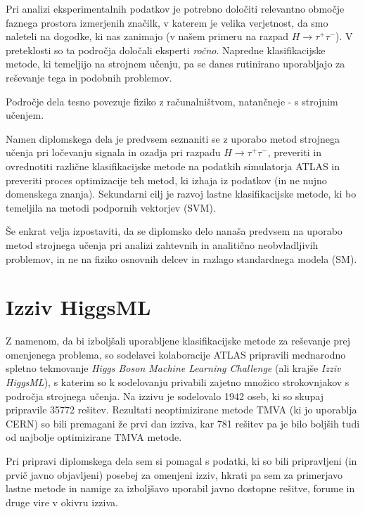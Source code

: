 \documentclass[11pt,a4paper,openany]{book}
\begin{document}
Pri analizi eksperimentalnih podatkov je potrebno določiti relevantno območje faznega prostora izmerjenih značilk, v katerem je velika verjetnost, da smo naleteli na dogodke, ki nas zanimajo (v našem primeru na razpad $H \rightarrow \tau^+\tau^-$). V preteklosti so ta področja določali eksperti \textit{ročno}\cite{Adam-Bourdarios14}. Napredne klasifikacijske metode, ki temeljijo na strojnem učenju, pa se danes rutinirano uporabljajo za reševanje tega in podobnih problemov\cite{atlas2013}.

Področje dela tesno povezuje fiziko z računalništvom, natančneje - s strojnim učenjem. 

Namen diplomskega dela je predvsem seznaniti se z uporabo metod strojnega učenja pri ločevanju signala in ozadja pri razpadu $H \rightarrow \tau^+\tau^-$, preveriti in ovrednotiti različne klasifikacijske metode na podatkih simulatorja ATLAS in preveriti proces optimizacije teh metod, ki izhaja iz podatkov (in ne nujno domenskega znanja). Sekundarni cilj je razvoj lastne klasifikacijske metode, ki bo temeljila na metodi podpornih vektorjev (SVM).

Še enkrat velja izpostaviti, da se diplomsko delo nanaša predvsem na uporabo metod strojnega učenja pri analizi zahtevnih in analitično neobvladljivih problemov, in ne na fiziko osnovnih delcev in razlago standardnega modela (SM).

\section*{Izziv HiggsML}
Z namenom, da bi izboljšali uporabljene klasifikacijske metode za reševanje prej omenjenega problema, so sodelavci kolaboracije ATLAS pripravili mednarodno spletno tekmovanje \textit{Higgs Boson Machine Learning Challenge} (ali krajše \textit{Izziv HiggsML})\cite{HiggsMLChallenge}, s katerim so k sodelovanju privabili zajetno množico strokovnjakov s področja strojnega učenja. Na izzivu je sodelovalo 1942 oseb, ki so skupaj pripravile 35772 rešitev. Rezultati neoptimizirane metode TMVA (ki jo uporablja CERN) so bili premagani že prvi dan izziva, kar 781 rešitev pa je bilo boljših tudi od najbolje optimizirane TMVA metode\cite{Adam-Bourdarios14}.

Pri pripravi diplomskega dela sem si pomagal s podatki, ki so bili pripravljeni (in prvič javno objavljeni) posebej za omenjeni izziv, hkrati pa sem za primerjavo lastne metode in namige za izboljšavo uporabil javno dostopne rešitve, forume in druge vire v okivru izziva.
\end{document}
